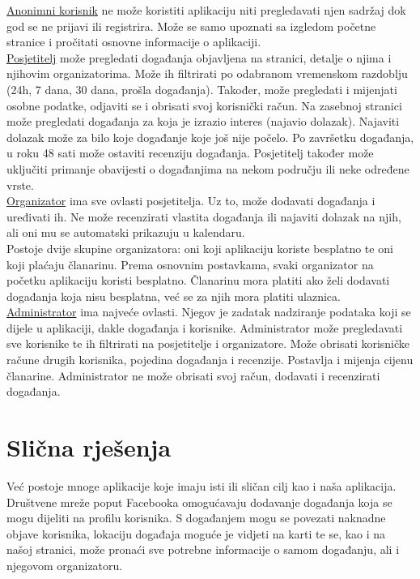 			\underline{Anonimni korisnik} ne može koristiti aplikaciju niti pregledavati njen sadržaj dok god se ne prijavi ili registrira. Može se samo upoznati sa izgledom početne stranice i pročitati osnovne informacije o aplikaciji. \\
			
			\underline{Posjetitelj} može pregledati događanja objavljena na stranici, detalje o njima i njihovim organizatorima. Može ih filtrirati po odabranom vremenskom razdoblju (24h, 7 dana, 30 dana, prošla događanja). Također, može pregledati i mijenjati osobne podatke, odjaviti se i obrisati svoj korisnički račun. Na zasebnoj stranici može pregledati događanja za koja je izrazio interes (najavio dolazak). Najaviti dolazak može za bilo koje događanje koje još nije počelo. Po završetku događanja, u roku 48 sati može ostaviti recenziju događanja. Posjetitelj također može uključiti primanje obavijesti o događanjima na nekom području ili neke određene vrste. \\
			
			\underline{Organizator} ima sve ovlasti posjetitelja. Uz to, može dodavati događanja i uređivati ih. Ne može recenzirati vlastita događanja ili najaviti dolazak na njih, ali oni mu se automatski prikazuju u kalendaru.\\
			Postoje dvije skupine organizatora: oni koji aplikaciju koriste besplatno te oni koji plaćaju članarinu. Prema osnovnim postavkama, svaki organizator na početku aplikaciju koristi besplatno. Članarinu mora platiti ako želi dodavati događanja koja nisu besplatna, već se za njih mora platiti ulaznica. \\
			
			\underline{Administrator} ima najveće ovlasti. Njegov je zadatak nadziranje podataka koji se dijele u aplikaciji, dakle događanja i korisnike. Administrator može pregledavati sve korisnike te ih filtrirati na posjetitelje i organizatore. Može obrisati korisničke račune drugih korisnika, pojedina događanja i recenzije. Postavlja i mijenja cijenu članarine. Administrator ne može obrisati svoj račun, dodavati i recenzirati događanja. 
		
		\section{Slična rješenja}
		
		Već postoje mnoge aplikacije koje imaju isti ili sličan cilj kao i naša aplikacija. \\
		Društvene mreže poput Facebooka omogućavaju dodavanje događanja koja se mogu dijeliti na profilu korisnika. S događanjem mogu se povezati naknadne objave korisnika, lokaciju događaja moguće je vidjeti na karti te se, kao i na našoj stranici, može pronaći sve potrebne informacije o samom događanju, ali i njegovom organizatoru. 
		
